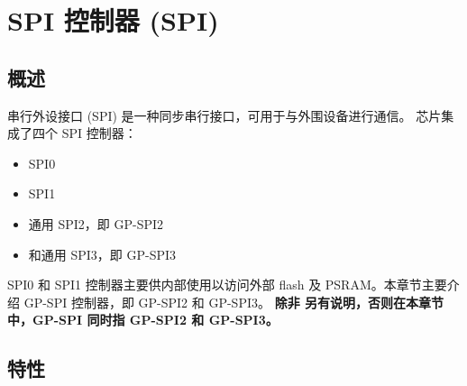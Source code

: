 \documentclass[main\_\_CN.tex]{subfiles}
\begin{document}

\ifglobal
\else
    {\let\clearpage\relax \listoftodos}
    \tableofcontents
\fi
\hypertarget{spi}{}
\chapter{SPI 控制器 (SPI)}
\label{mod:spi}

\section{概述}

串行外设接口 (SPI) 是一种同步串行接口，可用于与外围设备进行通信。
 \chipname{} 芯片集成了四个 SPI 控制器：
\begin{itemize}
  \item SPI0
  \item SPI1
  \item 通用 SPI2，即 GP-SPI2
  \item 和通用 SPI3，即 GP-SPI3
\end{itemize}

SPI0 和 SPI1 控制器主要供内部使用以访问外部 flash 及 PSRAM。本章节主要介绍 GP-SPI 控制器，即 GP-SPI2 和 GP-SPI3。 \textbf{除非
另有说明，否则在本章节中，GP-SPI 同时指 GP-SPI2 和 GP-SPI3。}



\section{特性}
\end{document}
